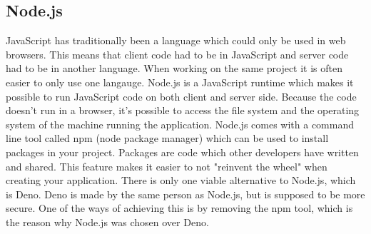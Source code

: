 \subsection{Node.js}
JavaScript has traditionally been a language which could only be used in web browsers. This means that client code had to be in JavaScript and server code had to be in another language. When working on the same project it is often easier to only use one langauge. Node.js is a JavaScript runtime which makes it possible to run JavaScript code on both client and server side. Because the code doesn't run in a browser, it's possible to access the file system and the operating system of the machine running the application. Node.js comes with a command line tool called npm (node package manager) which can be used to install packages in your project. Packages are code which other developers have written and shared. This feature makes it easier to not "reinvent the wheel" when creating your application. There is only one viable alternative to Node.js, which is Deno. Deno is made by the same person as Node.js, but is supposed to be more secure. One of the ways of achieving this is by removing the npm tool, which is the reason why Node.js was chosen over Deno.